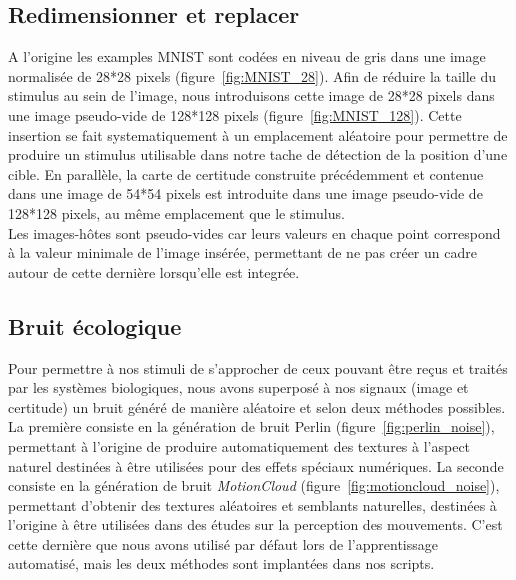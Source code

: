 \subsection{Redimensionner et replacer}
A l'origine les examples MNIST sont codées en niveau de gris dans une image normalisée de 28*28 pixels (figure~\ref{fig:MNIST_28}).
Afin de réduire la taille du stimulus au sein de l'image, nous introduisons cette image de 28*28 pixels dans une image pseudo-vide de 128*128 pixels (figure~\ref{fig:MNIST_128}).
Cette insertion se fait systematiquement à un emplacement aléatoire pour permettre de produire un stimulus utilisable dans notre tache de détection de la position d'une cible.
En parallèle, la carte de certitude construite précédemment et contenue dans une image de 54*54 pixels est introduite dans une image pseudo-vide de 128*128 pixels, au même emplacement que le stimulus. \\
Les images-hôtes sont pseudo-vides car leurs valeurs en chaque point correspond à la valeur minimale de l'image insérée, permettant de ne pas créer un cadre autour de cette dernière lorsqu'elle est integrée.

\subsection{Bruit écologique}
Pour permettre à nos stimuli de s'approcher de ceux pouvant être reçus et traités par les systèmes biologiques, nous avons superposé à nos signaux (image et certitude) un bruit généré de manière aléatoire et selon deux méthodes possibles.
La première consiste en la génération de bruit Perlin \autocite{Perlin1985} (figure~\ref{fig:perlin_noise}), permettant à l'origine de produire automatiquement des textures à l'aspect naturel destinées à être utilisées pour des effets spéciaux numériques.
La seconde consiste en la génération de bruit \textit{MotionCloud} (figure~\ref{fig:motioncloud_noise}), permettant d'obtenir des textures aléatoires et semblants naturelles, destinées à l'origine à être utilisées dans des études sur la perception des mouvements.
C'est cette dernière que nous avons utilisé par défaut lors de l'apprentissage automatisé, mais les deux méthodes sont implantées dans nos scripts. \autocite{Leon2012}

